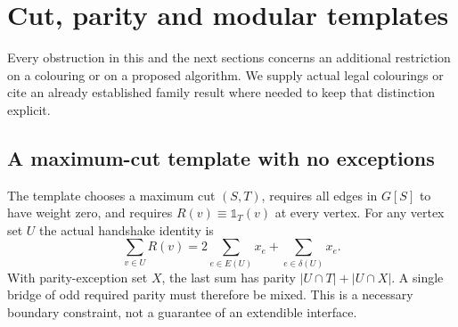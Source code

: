 \section{Cut, parity and modular templates}\label{sec:templates}

Every obstruction in this and the next sections concerns an additional
restriction on a colouring or on a proposed algorithm. We supply
actual legal colourings or cite an already established family result
where needed to keep that distinction explicit.

\subsection{A maximum-cut template with no exceptions}

The template chooses a maximum cut $(S,T)$, requires all edges in
$G[S]$ to have weight zero, and requires $R(v)\equiv\mathbb{1}_T(v)$
at every vertex. For any vertex set $U$ the actual handshake identity is
\begin{equation}\label{eq:boundaryhandshake}
 \sum_{v\in U}R(v)=2\sum_{e\in E(U)}x_e+
 \sum_{e\in\delta(U)}x_e.
\end{equation}
With parity-exception set $X$, the last sum has parity
$|U\cap T|+|U\cap X|$. A single bridge of odd required parity
must therefore be mixed. This is a necessary boundary constraint,
not a guarantee of an extendible interface.

